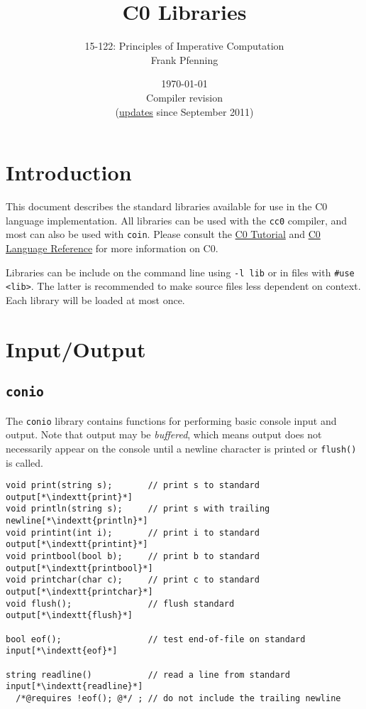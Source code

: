 \documentclass[11pt]{article}
\title{C0 Libraries}
\author{15-122: Principles of Imperative Computation \\ Frank Pfenning}
\date{\today\\Compiler revision \rev\\
  (\hyperlink{sec:updates}{updates} since September 2011)}
\makeatletter
\newcommand{\indextt}[1]{\index{#1@\texttt{#1}}}
\makeatother
\begin{document}
\maketitle
\tableofcontents

\newpage
\section{Introduction}

This document describes the standard libraries available for use
in the C0 language implementation.  All libraries can be used
with the \lstinline'cc0' compiler, and most can also be used with
\lstinline'coin'.   Please consult the
\href{http://c0.typesafety.net/tutorial}{C0 Tutorial} and
\href{http://c0.typesafety.net/doc/c0-reference.pdf}{C0 Language
Reference} for more information on C0.

Libraries can be include on the command line using \lstinline'-l lib' or in
files with \lstinline'#use <lib>'.  The latter is recommended to make
source files less dependent on context.  Each library will be loaded
at most once.

\section{Input/Output}

\subsection{\tt conio}

The \lstinline'conio' library contains functions for performing basic
console input and output.  Note that output may be \emph{buffered},
which means output does not necessarily appear on the console
until a newline character is printed or \lstinline'flush()' is called.

\begin{lstlisting}
void print(string s);       // print s to standard output[*\indextt{print}*]
void println(string s);     // print s with trailing newline[*\indextt{println}*]
void printint(int i);       // print i to standard output[*\indextt{printint}*]
void printbool(bool b);     // print b to standard output[*\indextt{printbool}*]
void printchar(char c);     // print c to standard output[*\indextt{printchar}*]
void flush();               // flush standard output[*\indextt{flush}*]

bool eof();                 // test end-of-file on standard input[*\indextt{eof}*]

string readline()           // read a line from standard input[*\indextt{readline}*]
  /*@requires !eof(); @*/ ; // do not include the trailing newline
\end{lstlisting}
\end{document}
